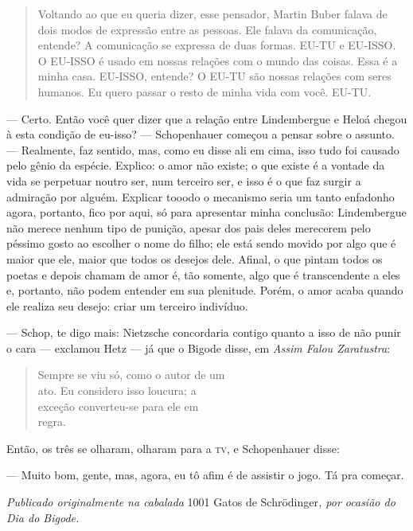 \begin{quotation}
Voltando ao que eu queria dizer, esse pensador, Martin Buber falava de dois modos de expressão entre as pessoas. Ele falava da comunicação, entende? A comunicação se expressa de duas formas. EU-TU e EU-ISSO. O EU-ISSO é usado em nossas relações com o mundo das coisas. Essa é a minha casa. EU-ISSO, entende? O EU-TU são nossas relações com seres humanos. Eu quero passar o resto de minha vida com você. EU-TU.
\end{quotation}

--- Certo. Então você quer dizer que a relação entre Lindembergue e Heloá chegou à esta condição de eu-isso? --- Schopenhauer começou a pensar sobre o assunto. --- Realmente, faz sentido, mas, como eu disse ali em cima, isso tudo foi causado pelo gênio da espécie. Explico: o amor não existe; o que existe é a vontade da vida se perpetuar noutro ser, num terceiro ser, e isso é o que faz surgir a admiração por alguém. Explicar tooodo o mecanismo seria um tanto enfadonho agora, portanto, fico por aqui, só para apresentar minha conclusão: Lindembergue não merece nenhum tipo de punição, apesar dos pais deles merecerem pelo péssimo gosto ao escolher o nome do filho; ele está sendo movido por algo que é maior que ele, maior que todos os desejos dele. Afinal, o que pintam todos os poetas e depois chamam de amor é, tão somente, algo que é transcendente a eles e, portanto, não podem entender em sua plenitude. Porém, o amor acaba quando ele realiza seu desejo: criar um terceiro indivíduo.

--- Schop, te digo mais: Nietzsche concordaria contigo quan\-to a isso de não punir o cara --- exclamou Hetz --- já que o Bigode disse, em \emph{Assim Falou Zaratustra}:

\begin{verse}
Sempre se viu só, como o autor de um \\
ato. Eu considero isso loucura; a \\
exceção converteu-se para ele em \\
regra. \\
\end{verse}

Então, os três se olharam, olharam para a \textsc{tv}, e Schopenhauer disse:

--- Muito bom, gente, mas, agora, eu tô afim é de assistir o jogo. Tá pra começar.

\begin{center}
\emph{Publicado originalmente na cabalada} 1001 Gatos de Schrödinger\emph{, por ocasião do Dia do Bigode.}
\end{center}
